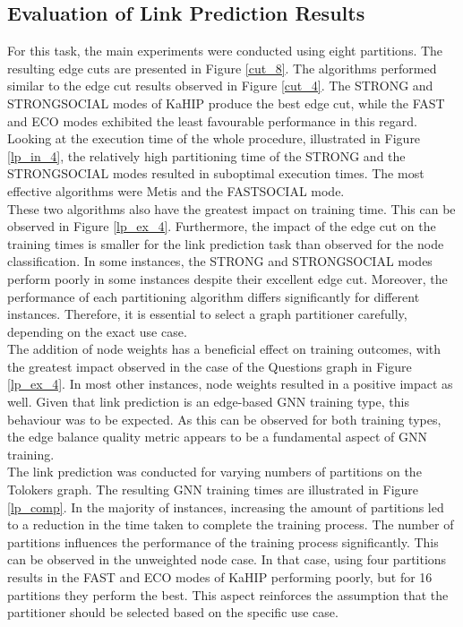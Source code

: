 \documentclass[acmsmall,nonacm,screen,review]{acmart}
\begin{document}
\subsection{Evaluation of Link Prediction Results}
For this task, the main experiments were conducted using eight partitions. The resulting edge cuts are presented in Figure \ref{cut_8}. The algorithms performed similar to the edge cut results observed in Figure \ref{cut_4}. The STRONG and STRONGSOCIAL modes of KaHIP produce the best edge cut, while the FAST and ECO modes exhibited the least favourable performance in this regard. \\
Looking at the execution time of the whole procedure, illustrated in Figure \ref{lp_in_4}, the relatively high partitioning time of the STRONG and the STRONGSOCIAL modes resulted in suboptimal execution times. The most effective algorithms were Metis and the FASTSOCIAL mode. \\
These two algorithms also have the greatest impact on training time. This can be observed in Figure \ref{lp_ex_4}. Furthermore, the impact of the edge cut on the training times is smaller for the link prediction task than observed for the node classification. In some instances, the STRONG and STRONGSOCIAL modes perform poorly in some instances despite their excellent edge cut. Moreover, the performance of each partitioning algorithm differs significantly for different instances. Therefore, it is essential to select a graph partitioner carefully, depending on the exact use case. \\
The addition of node weights has a beneficial effect on training outcomes, with the greatest impact observed in the case of the Questions graph in Figure \ref{lp_ex_4}. In most other instances, node weights resulted in a positive impact as well. Given that link prediction is an edge-based GNN training type, this behaviour was to be expected. As this can be observed for both training types, the edge balance quality metric appears to be a fundamental aspect of GNN training. \\
The link prediction was conducted for varying numbers of partitions on the Tolokers graph. The resulting GNN training times are illustrated in Figure \ref{lp_comp}. In the majority of instances, increasing the amount of partitions led to a reduction in the time taken to complete the training process. The number of partitions influences the performance of the training process significantly. This can be observed in the unweighted node case. In that case, using four partitions results in the FAST and ECO modes of KaHIP performing poorly, but for 16 partitions they perform the best. This aspect reinforces the assumption that the partitioner should be selected based on the specific use case.\\
\end{document}
